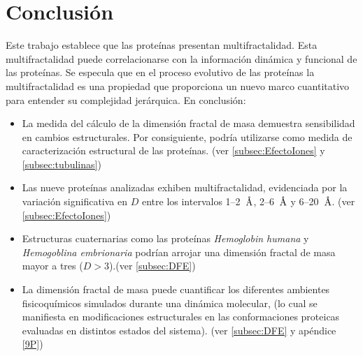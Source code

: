 \chapter{Conclusi\'{o}n}


\color{blue}

Este trabajo establece que las prote\'{i}nas presentan multifractalidad. Esta multifractalidad puede correlacionarse con la informaci\'{o}n din\'{a}mica y funcional de las prote\'{i}nas. Se especula que en el proceso evolutivo de las prote\'{i}nas la multifractalidad es una propiedad que proporciona un nuevo marco cuantitativo para entender su complejidad jer\'{a}rquica. En conclusi\'{o}n:


\begin{itemize}
	\item La medida del c\'{a}lculo de la dimensi\'{o}n fractal de masa demuestra sensibilidad en
	 cambios estructurales. Por consiguiente, podr\'{i}a utilizarse como medida de caracterizaci\'{o}n estructural de las prote\'{i}nas. (ver \ref{subsec:EfectoIones} y \ref{subsec:tubulinas})
	
	\item Las nueve prote\'{i}nas analizadas exhiben multifractalidad, evidenciada por la variaci\'{o}n 
	significativa en $D$ entre los intervalos 1--2~$\textup{\r{A}}$, 2--6~$\textup{\r{A}}$ y 6--20~$\textup{\r{A}}$. (ver \ref{subsec:EfectoIones})
	
	\item Estructuras cuaternarias como las prote\'{i}nas \textit{Hemoglobin humana} y \textit{Hemogoblina embrionaria} podr\'{i}an arrojar una dimensi\'{o}n fractal de masa mayor a tres ($D>3$).(ver \ref{subsec:DFE})
	
	
	\item La dimensi\'{o}n fractal de masa puede cuantificar los diferentes ambientes fisicoqu\'{i}micos simulados durante una din\'{a}mica molecular, (lo cual se manifiesta en modificaciones estructurales en las conformaciones proteicas evaluadas en distintos estados del sistema). (ver \ref{subsec:DFE} y apéndice \ref{9P})
	
 \color{black}
 
\end{itemize}



